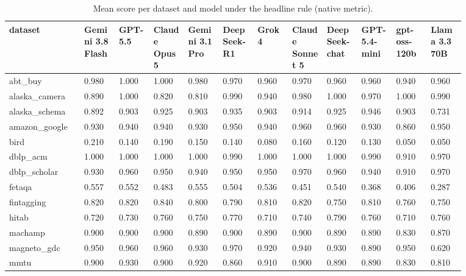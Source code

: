 \begin{landscape}
\tiny
\setlength{\tabcolsep}{3pt}
\begin{longtable}{p{0.134\linewidth}p{0.067\linewidth}p{0.067\linewidth}p{0.067\linewidth}p{0.067\linewidth}p{0.067\linewidth}p{0.067\linewidth}p{0.067\linewidth}p{0.067\linewidth}p{0.067\linewidth}p{0.067\linewidth}p{0.067\linewidth}}
\caption{Mean score per dataset and model under the headline rule (native metric).}\label{tab:per_dataset_mean_native}\\
\toprule
dataset & Gemini 3.8 Flash & GPT-5.5 & Claude Opus 5 & Gemini 3.1 Pro & DeepSeek-R1 & Grok 4 & Claude Sonnet 5 & DeepSeek-chat & GPT-5.4-mini & gpt-oss-120b & Llama 3.3 70B \\
\midrule
abt\_\allowbreak{}buy & 0.980 & 1.000 & 1.000 & 0.980 & 0.970 & 0.960 & 0.970 & 0.960 & 0.960 & 0.940 & 0.960 \\
alaska\_\allowbreak{}camera & 0.890 & 1.000 & 0.820 & 0.810 & 0.990 & 0.940 & 0.980 & 1.000 & 0.970 & 1.000 & 0.990 \\
alaska\_\allowbreak{}schema & 0.892 & 0.903 & 0.925 & 0.903 & 0.935 & 0.903 & 0.914 & 0.925 & 0.946 & 0.903 & 0.731 \\
amazon\_\allowbreak{}google & 0.930 & 0.940 & 0.940 & 0.930 & 0.950 & 0.940 & 0.960 & 0.960 & 0.930 & 0.860 & 0.950 \\
bird & 0.210 & 0.140 & 0.190 & 0.150 & 0.140 & 0.080 & 0.160 & 0.120 & 0.130 & 0.050 & 0.050 \\
dblp\_\allowbreak{}acm & 1.000 & 1.000 & 1.000 & 1.000 & 0.990 & 1.000 & 1.000 & 1.000 & 0.990 & 0.910 & 0.970 \\
dblp\_\allowbreak{}scholar & 0.930 & 0.960 & 0.950 & 0.940 & 0.950 & 0.950 & 0.970 & 0.960 & 0.940 & 0.910 & 0.970 \\
fetaqa & 0.557 & 0.552 & 0.483 & 0.555 & 0.504 & 0.536 & 0.451 & 0.540 & 0.368 & 0.406 & 0.287 \\
fintagging & 0.820 & 0.820 & 0.840 & 0.800 & 0.790 & 0.810 & 0.820 & 0.750 & 0.810 & 0.760 & 0.750 \\
hitab & 0.720 & 0.730 & 0.760 & 0.750 & 0.770 & 0.710 & 0.740 & 0.790 & 0.760 & 0.710 & 0.760 \\
machamp & 0.900 & 0.900 & 0.900 & 0.890 & 0.900 & 0.890 & 0.900 & 0.890 & 0.890 & 0.830 & 0.870 \\
magneto\_\allowbreak{}gdc & 0.950 & 0.960 & 0.960 & 0.930 & 0.970 & 0.920 & 0.940 & 0.930 & 0.890 & 0.950 & 0.620 \\
mmtu & 0.900 & 0.930 & 0.900 & 0.920 & 0.860 & 0.910 & 0.900 & 0.890 & 0.890 & 0.830 & 0.810 \\

\end{longtable}
\end{landscape}

